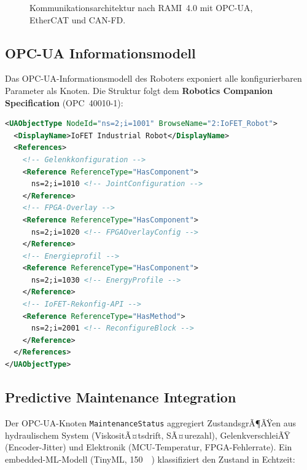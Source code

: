 ﻿\documentclass[a4paper,12pt]{scrreprt}
\theoremstyle{definition}
\begin{document}
\begin{figure}[H]
\caption{Kommunikationsarchitektur nach RAMI~4.0 mit OPC-UA, EtherCAT
  und CAN-FD.}
\label{fig:komm}
\end{figure}

\subsection{OPC-UA Informationsmodell}

Das OPC-UA-Informationsmodell des Roboters exponiert alle
konfigurierbaren Parameter als Knoten. Die Struktur folgt dem
\textbf{Robotics Companion Specification} (OPC~40010-1):

\begin{lstlisting}[caption={OPC-UA NodeSet -- Ausschnitt IoFET-Roboterknoten},
  language=XML]
<UAObjectType NodeId="ns=2;i=1001" BrowseName="2:IoFET_Robot">
  <DisplayName>IoFET Industrial Robot</DisplayName>
  <References>
    <!-- Gelenkkonfiguration -->
    <Reference ReferenceType="HasComponent">
      ns=2;i=1010 <!-- JointConfiguration -->
    </Reference>
    <!-- FPGA-Overlay -->
    <Reference ReferenceType="HasComponent">
      ns=2;i=1020 <!-- FPGAOverlayConfig -->
    </Reference>
    <!-- Energieprofil -->
    <Reference ReferenceType="HasComponent">
      ns=2;i=1030 <!-- EnergyProfile -->
    </Reference>
    <!-- IoFET-Rekonfig-API -->
    <Reference ReferenceType="HasMethod">
      ns=2;i=2001 <!-- ReconfigureBlock -->
    </Reference>
  </References>
</UAObjectType>
\end{lstlisting}

\subsection{Predictive Maintenance Integration}

Der OPC-UA-Knoten \texttt{MaintenanceStatus} aggregiert
ZustandsgrÃ¶ÃŸen aus hydraulischem System (ViskositÃ¤tsdrift,
SÃ¤urezahl), GelenkverschleiÃŸ (Encoder-Jitter) und
Elektronik (MCU-Temperatur, FPGA-Fehlerrate). Ein
embedded-ML-Modell (TinyML, \SI{150}{\kilo\byte}) klassifiziert
den Zustand in Echtzeit:
\end{document}
